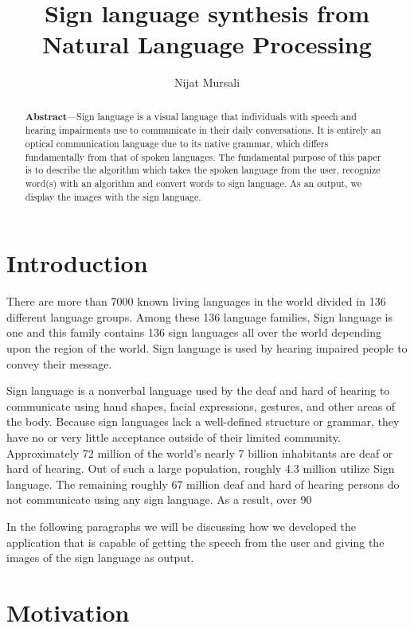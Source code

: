 \documentclass[twocolumn,10pt]{asme2ej}
\title{Sign language synthesis from Natural Language Processing}
\author{Nijat Mursali
\affiliation{
Department of Artificial Intelligence and Robotics\\
Sapienza University of Rome\\
}}
\begin{document}
\maketitle    

\begin{abstract}
{
{\bf Abstract}—Sign language is a visual language that individuals with speech and hearing impairments use to communicate in their daily conversations. It is entirely an optical communication language due to its native grammar, which differs fundamentally from that of spoken languages.
The fundamental purpose of this paper is to describe the algorithm which takes the spoken language from the user, recognize word(s) with an algorithm and convert words to sign language. As an output, we display the images with the sign language. 
}
\end{abstract}

\section{Introduction}

There are more than 7000 known living languages in the world divided in 136 different language groups. Among these 136 language families, Sign language is one and this family contains 136 sign languages all over the world depending upon the region of the world. Sign language is used by hearing impaired people to convey their message. 

Sign language is a nonverbal language used by the deaf and hard of hearing to communicate using hand shapes, facial expressions, gestures, and other areas of the body. Because sign languages lack a well-defined structure or grammar, they have no or very little acceptance outside of their limited community. Approximately 72 million of the world's nearly 7 billion inhabitants are deaf or hard of hearing. Out of such a large population, roughly 4.3 million utilize Sign language. The remaining roughly 67 million deaf and hard of hearing persons do not communicate using any sign language. As a result, over 90%

In the following paragraphs we will be discussing how we developed the application that is capable of getting the speech from the user and giving the images of the sign language as output.

\section{Motivation}
\end{document}
